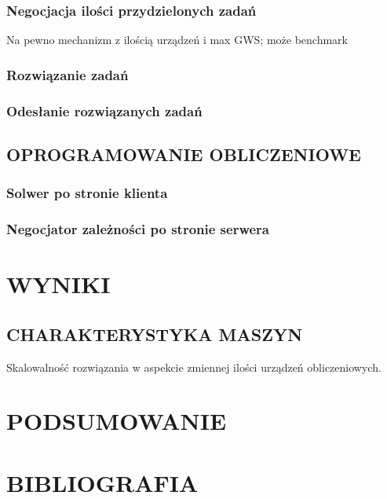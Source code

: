 \documentclass[12pt,a4paper,twoside]{article}
\begin{document}
\subsubsection{Negocjacja ilości przydzielonych zadań}

Na pewno mechanizm z ilością urządzeń i max GWS; może benchmark

\subsubsection{Rozwiązanie zadań}

\subsubsection{Odesłanie rozwiązanych zadań}


\subsection{OPROGRAMOWANIE OBLICZENIOWE}

\subsubsection{Solwer po stronie klienta}

\subsubsection{Negocjator zależności po stronie serwera}


\section{WYNIKI}

\subsection{CHARAKTERYSTYKA MASZYN}

Skalowalność rozwiązania w aspekcie zmiennej ilości urządzeń obliczeniowych.


\section{PODSUMOWANIE}


\newpage

\section{BIBLIOGRAFIA}
\end{document}
